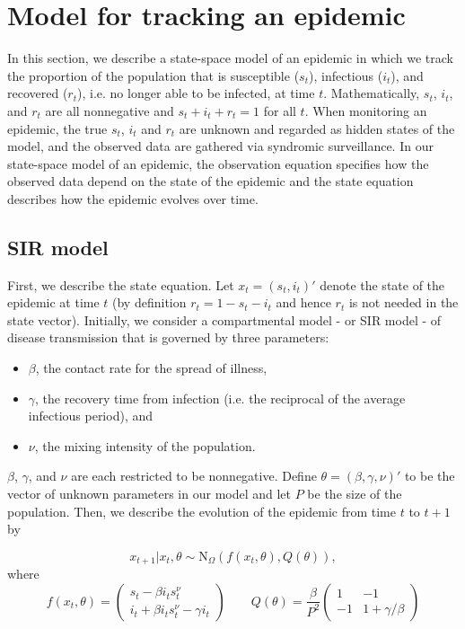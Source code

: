 \section{Model for tracking an epidemic \label{sec:epid}}

In this section, we describe a state-space model of an epidemic in which we track the proportion of the population that is susceptible ($s_t$), infectious ($i_t$), and recovered ($r_t$), i.e. no longer able to be infected, at time $t$. Mathematically, $s_t$, $i_t$, and $r_t$ are all nonnegative and $s_t + i_t + r_t = 1$ for all $t$. When monitoring an epidemic, the true $s_t$, $i_t$ and $r_t$ are unknown and regarded as hidden states of the model, and the observed data are gathered via syndromic surveillance. In our state-space model of an epidemic, the observation equation specifies how the observed data depend on the state of the epidemic and the state equation describes how the epidemic evolves over time.

\subsection{SIR model \label{sec:epid:state}}

First, we describe the state equation. Let $x_t = (s_t,i_t)'$ denote the state of the epidemic at time $t$ (by definition $r_t=1-s_t-i_t$ and hence $r_t$ is not needed in the state vector). Initially, we consider a compartmental model - or SIR model - of disease transmission that is governed by three parameters:

\begin{itemize}
\item $\beta$, the contact rate for the spread of illness,
\item $\gamma$, the recovery time from infection (i.e. the reciprocal of the average infectious period), and
\item $\nu$, the mixing intensity of the population.
\end{itemize}

\noindent $\beta$, $\gamma$, and $\nu$ are each restricted to be nonnegative. Define $\theta = (\beta,\gamma,\nu)'$ to be the vector of unknown parameters in our model and let $P$ be the size of the population. Then, we describe the evolution of the epidemic from time $t$ to $t + 1$ by

\begin{equation}
x_{t+1}\left|x_t,\theta\right. \sim \mbox{N}_\Omega\left(f(x_t,\theta),Q(\theta)\right), \label{eqn:epid:state}
\end{equation}
\noindent where
\[
f(x_t,\theta) = \left(
\begin{array}{c}
s_t - \beta i_ts^\nu_t \phantom{- \gamma i_t}\,\, \\
i_t +  \beta i_ts^\nu_t - \gamma i_t
\end{array}
\right)
\qquad
Q(\theta) = \frac{\beta}{P^2} \left(
\begin{array}{ccccc}
1 & -1 \\
-1 & 1 + \gamma/\beta
\end{array}
\right)
\]

